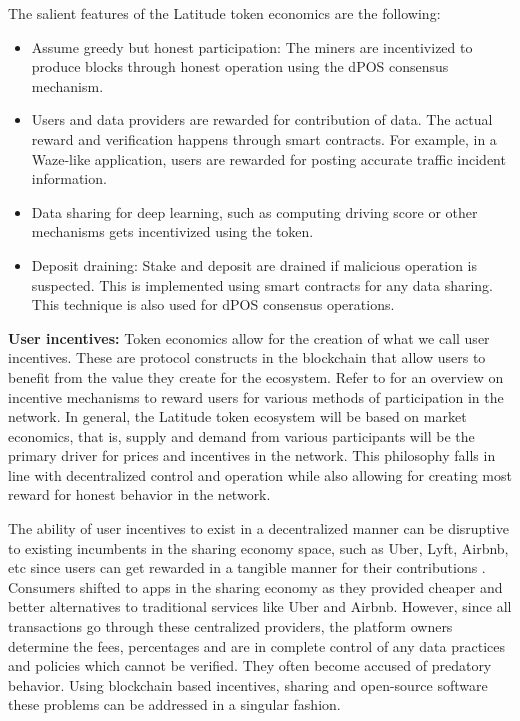 The salient features of the Latitude token economics are the following:
\begin{itemize}
    \item Assume greedy but honest participation: The miners are incentivized to produce blocks through honest operation
        using the dPOS consensus mechanism.
    \item Users and data providers are rewarded for contribution of data. The actual reward and verification happens
        through smart contracts. For example, in a Waze-like application, users are rewarded for posting accurate
        traffic incident information.
    \item Data sharing for deep learning, such as computing driving score or other mechanisms gets incentivized using
        the token.
    \item Deposit draining: Stake and deposit are drained if malicious operation is suspected. This is implemented using
        smart contracts for any data sharing. This technique is also used for dPOS consensus operations.
\end{itemize}


\noindent
{\bf User incentives:}
Token economics allow for the creation of what we call user incentives. These are protocol constructs in the blockchain
that allow users to benefit from the value they create for the ecosystem. Refer to \cite{token_ecos} for an overview on
incentive mechanisms to reward users for various methods of participation in the network. In general, the Latitude token
ecosystem will be based on market economics, that is, supply and demand from various participants will be the primary
driver for prices and incentives in the network. This philosophy falls in line with decentralized control and operation
while also allowing for creating most reward for honest behavior in the network.

The ability of user incentives to exist in a decentralized manner can be disruptive to existing incumbents in the
sharing economy space, such as Uber, Lyft, Airbnb, etc since users can get rewarded in a tangible manner for their
contributions \cite{sharing_eco_bc}. Consumers shifted to apps in the sharing economy as they provided cheaper and
better alternatives to traditional services like Uber and Airbnb. However, since all transactions go through these
centralized providers, the platform owners determine the fees, percentages and are in complete control of any data
practices and policies which cannot be verified. They often become accused of predatory behavior. Using blockchain based
incentives, sharing and open-source software these problems can be addressed in a singular fashion.

